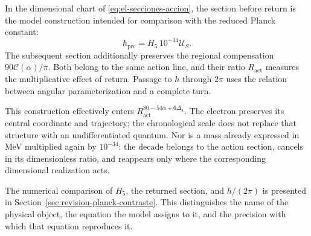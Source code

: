 In the dimensional chart of \eqref{eq:el-secciones-accion}, the
section before return is the model construction intended for comparison
with the reduced Planck constant:
\[
 \hbar_{\mathrm{pre}}=H_5\,10^{-34}\mathcal U_S.
\]
The subsequent section additionally preserves the regional compensation
\(90\mathscr C(\alpha)/\pi\). Both belong to the same action
line, and their ratio \(R_{\mathrm{act}}\) measures the multiplicative effect
of return. Passage to \(h\) through \(2\pi\) uses the relation
between angular parameterization and a complete turn.

This construction effectively enters
\(R_{\mathrm{act}}^{80-54\alpha+6\Delta_4}\). The electron preserves
its central coordinate and trajectory; the chronological scale does not
replace that structure with an undifferentiated quantum. Nor is a
mass already expressed in MeV multiplied again by \(10^{-34}\):
the decade belongs to the action section, cancels in its dimensionless
ratio, and reappears only where the corresponding dimensional
realization acts.

The numerical comparison of \(H_5\), the returned section, and
\(h/(2\pi)\) is presented in Section~\ref{sec:revision-planck-contraste}.
This distinguishes the name of the physical object, the equation the
model assigns to it, and the precision with which that equation reproduces it.
